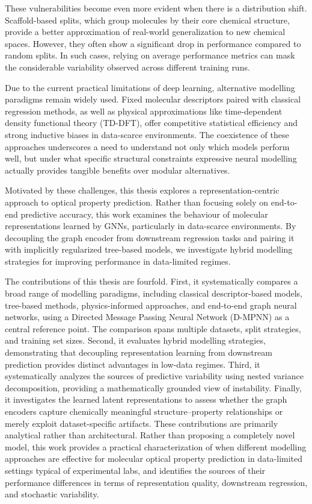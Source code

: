 These vulnerabilities become even more evident when there is a distribution shift. Scaffold-based splits, which group molecules by their core chemical structure, provide a better approximation of real-world generalization to new chemical spaces. However, they often show a significant drop in performance compared to random splits. In such cases, relying on average performance metrics can mask the considerable variability observed across different training runs.

Due to the current practical limitations of deep learning, alternative modelling paradigms remain widely used. Fixed molecular descriptors paired with classical regression methods, as well as physical approximations like time-dependent density functional theory (TD-DFT), offer competitive statistical efficiency and strong inductive biases in data-scarce environments. The coexistence of these approaches underscores a need to understand not only which models perform well, but under what specific structural constraints expressive neural modelling actually provides tangible benefits over modular alternatives.

Motivated by these challenges, this thesis explores a representation-centric approach to optical property prediction. Rather than focusing solely on end-to-end predictive accuracy, this work examines the behaviour of molecular representations learned by GNNs, particularly in data-scarce environments. By decoupling the graph encoder from downstream regression tasks and pairing it with implicitly regularized tree-based models, we investigate hybrid modelling strategies for improving performance in data-limited regimes.

The contributions of this thesis are fourfold. First, it systematically compares a broad range of modelling paradigms, including classical descriptor-based models, tree-based methods, physics-informed approaches, and end-to-end graph neural networks, using a Directed Message Passing Neural Network (D-MPNN) as a central reference point. The comparison spans multiple datasets, split strategies, and training set sizes. Second, it evaluates hybrid modelling strategies, demonstrating that decoupling representation learning from downstream prediction provides distinct advantages in low-data regimes. Third, it systematically analyzes the sources of predictive variability using nested variance decomposition, providing a mathematically grounded view of instability. Finally, it investigates the learned latent representations to assess whether the graph encoders capture chemically meaningful structure--property relationships or merely exploit dataset-specific artifacts. These contributions are primarily analytical rather than architectural. Rather than proposing a completely novel model, this work provides a practical characterization of when different modelling approaches are effective for molecular optical property prediction in data-limited settings typical of experimental labs, and identifies the sources of their performance differences in terms of representation quality, downstream regression, and stochastic variability.


